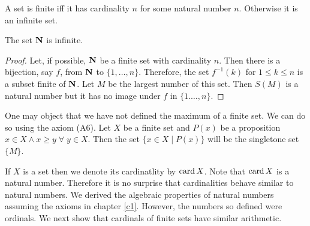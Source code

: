 \begin{defn}\label{c2s6d3}
A set is finite iff it has cardinality $n$ for some natural number $n$. 
Otherwise it is an infinite set.
\end{defn}

\begin{thm}\label{c2s6t1}
The set $\mathbf{N}$ is infinite.
\end{thm}
\begin{proof}
Let, if possible, $\mathbf{N}$ be a finite set with cardinality $n$. Then there 
is a bijection, say $f$, from $\mathbf{N}$ to $\{1, \ldots, n\}$. Therefore, the 
set $f^{-1}(k)$ for $1 \le k \le n$ is a subset finite of $\mathbf{N}$. Let $M$ 
be the largest number of this set. Then $S(M)$ is a natural number but it
has no image under $f$ in $\{1. \ldots, n\}$.
\end{proof}

\begin{rem}
One may object that we have not defined the maximum of a finite set. We
can do so using the axiom (A6). Let $X$ be a finite set and $P(x)$ be a 
proposition $x \in X \land x \ge y \;\forall\; y \in X$. Then the set $\{x 
\in X \;| \; P(x)\}$ will be the singletone set $\{M\}$.
\end{rem}

If $X$ is a set then we denote its cardinatlity by $\operatorname{card} X$. Note that
$\operatorname{card} X$ is a natural number. Therefore it is no surprise that 
cardinalities behave similar to natural numbers. We derived the algebraic
properties of natural numbers assuming the axioms in chapter \ref{c1}. 
However, the numbers so defined were ordinals. We next show that cardinals
of finite sets have similar arithmetic.

